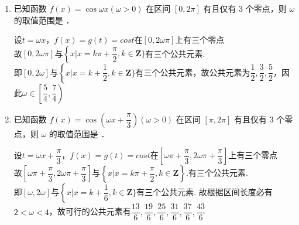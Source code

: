 \begin{enumerate}
    \item 已知函数 $f(x)=\cos \omega x(\omega>0)$ 在区间 $[0,2 \pi]$ 有且仅有 3 个零点，则 $\omega$ 的取值范围是 \blkda[2]{$\left[\dfrac{5}{4},\dfrac{7}{4}\right)$} ．
    \begin{jieda}
        设$t = \omega x$，$f(x) = g(t) = cost$在$\left[0, 2\omega\pi\right]$上有三个零点 \\
        故$\left[0, 2\omega\pi\right]$与$\left \{ x | x = k\pi + \dfrac{\pi}{2}, k \in \mathbf{Z}\}\right.$有三个公共元素. \\
        即$\left[0, 2\omega\right]$与$\left \{ x | x = k + \dfrac{1}{2}, k \in \mathbf{Z}\}\right.$有三个公共元素，故公共元素为$\dfrac{1}{2}, \dfrac{3}{2}, \dfrac{5}{2}$，因此$\omega \in \left[\dfrac{5}{4},\dfrac{7}{4}\right)$
    \end{jieda}
    \item 已知函数 $f(x)=\cos(\omega x + \dfrac{\pi}{3})(\omega>0)$ 在区间 $[\pi,2 \pi]$ 有且仅有 3 个零点，则 $\omega$ 的取值范围是 \blkda[6]{$\left[\dfrac{25}{12}, \dfrac{13}{6}\right] \cup \left[\dfrac{31}{12}, \dfrac{37}{12}\right)\cup \left(\dfrac{19}{6}, \dfrac{43}{12}\right) $} ．
    \begin{jieda}
        设$t = \omega x + \dfrac{\pi}{3}$，$f(x) = g(t) = cost$在$\left[\omega \pi + \dfrac{\pi}{3}, 2\omega\pi+\dfrac{\pi}{3}\right]$上有三个零点 \\
        故$\left[\omega \pi + \dfrac{\pi}{3}, 2\omega\pi+\dfrac{\pi}{3}\right]$与$\left \{ x | x = k\pi + \dfrac{\pi}{2}, k \in \mathbf{Z}\right\}.$有三个公共元素. \\
        即$\left[\omega, 2\omega\right]$与$\left \{ x | x = k + \dfrac{1}{6}, k \in \mathbf{Z}\}\right.$有三个公共元素. 
        故根据区间长度必有$2 < \omega < 4$，故可行的公共元素有$\dfrac{13}{6},\dfrac{19}{6}, \dfrac{25}{6}, \dfrac{31}{6}, \dfrac{37}{6}, \dfrac{43}{6}$
\end{jieda}
\end{enumerate}
